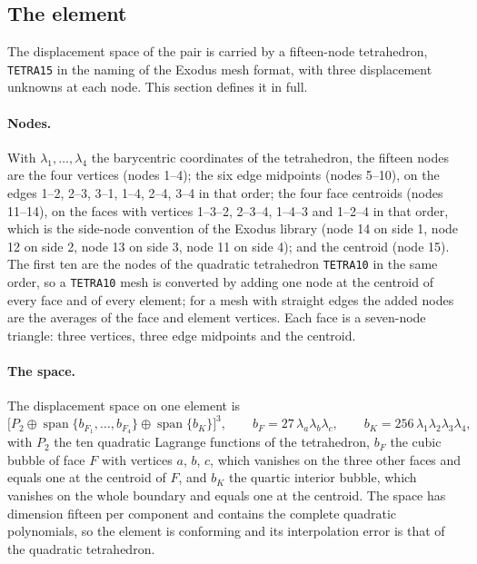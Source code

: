 \documentclass[11pt]{article}
\newcommand{\code}[1]{\texttt{#1}}
\theoremstyle{definition}
\theoremstyle{plain}
\begin{document}
\subsection{The element}
\label{sec:element}

The displacement space of the pair is carried by a fifteen-node
tetrahedron, \code{TETRA15} in the naming of the Exodus mesh format, with
three displacement unknowns at each node. This section defines it in full.

\paragraph{Nodes.} With $\lambda_1, \dots, \lambda_4$ the barycentric
coordinates of the tetrahedron, the fifteen nodes are the four vertices
(nodes 1--4); the six edge midpoints (nodes 5--10), on the edges 1--2, 2--3,
3--1, 1--4, 2--4, 3--4 in that order; the four face centroids (nodes
11--14), on the faces with vertices 1--3--2, 2--3--4, 1--4--3 and 1--2--4 in
that order, which is the side-node convention of the Exodus library (node
14 on side 1, node 12 on side 2, node 13 on side 3, node 11 on side 4); and
the centroid (node 15). The first ten are the nodes of the quadratic
tetrahedron \code{TETRA10} in the same order, so a \code{TETRA10} mesh is
converted by adding one node at the centroid of every face and of every
element; for a mesh with straight edges the added nodes are the averages of
the face and element vertices. Each face is a seven-node triangle: three
vertices, three edge midpoints and the centroid.

\paragraph{The space.} The displacement space on one element is
\begin{equation}
  \label{eq:space}
  \big[ P_2 \oplus \operatorname{span}\{b_{F_1}, \dots, b_{F_4}\}
        \oplus \operatorname{span}\{b_K\} \big]^3,
  \qquad
  b_F = 27\,\lambda_a\lambda_b\lambda_c, \qquad
  b_K = 256\,\lambda_1\lambda_2\lambda_3\lambda_4 ,
\end{equation}
with $P_2$ the ten quadratic Lagrange functions of the tetrahedron, $b_F$
the cubic bubble of face $F$ with vertices $a$, $b$, $c$, which vanishes on
the three other faces and equals one at the centroid of $F$, and $b_K$ the
quartic interior bubble, which vanishes on the whole boundary and equals
one at the centroid. The space has dimension fifteen per component and
contains the complete quadratic polynomials, so the element is conforming
and its interpolation error is that of the quadratic tetrahedron.
\end{document}
